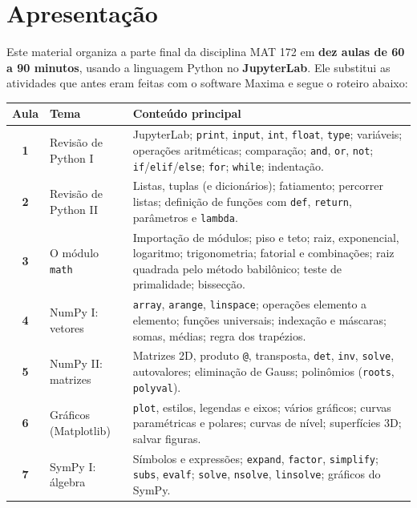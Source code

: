 \chapter*{Apresentação}

Este material organiza a parte final da disciplina MAT 172 em \textbf{dez aulas de 60 a 90 minutos},
usando a linguagem Python no \textbf{JupyterLab}. Ele substitui as atividades que antes eram feitas com o
software Maxima e segue o roteiro abaixo:

\begin{center}
\renewcommand{\arraystretch}{1.25}
\begin{tabularx}{\linewidth}{@{}>{\sffamily\bfseries}c >{\raggedright\arraybackslash}p{4.2cm} X @{}}
\toprule
\textbf{Aula} & \textbf{Tema} & \textbf{Conteúdo principal}\\
\midrule
1 & Revisão de Python I & JupyterLab; \texttt{print}, \texttt{input}, \texttt{int}, \texttt{float}, \texttt{type}; variáveis; operações aritméticas; comparação; \texttt{and}, \texttt{or}, \texttt{not}; \texttt{if}/\texttt{elif}/\texttt{else}; \texttt{for}; \texttt{while}; indentação.\\
2 & Revisão de Python II & Listas, tuplas (e dicionários); fatiamento; percorrer listas; definição de funções com \texttt{def}, \texttt{return}, parâmetros e \texttt{lambda}.\\
3 & O módulo \texttt{math} & Importação de módulos; piso e teto; raiz, exponencial, logaritmo; trigonometria; fatorial e combinações; raiz quadrada pelo método babilônico; teste de primalidade; bissecção.\\
4 & NumPy I: vetores & \texttt{array}, \texttt{arange}, \texttt{linspace}; operações elemento a elemento; funções universais; indexação e máscaras; somas, médias; regra dos trapézios.\\
5 & NumPy II: matrizes & Matrizes 2D, produto \texttt{@}, transposta, \texttt{det}, \texttt{inv}, \texttt{solve}, autovalores; eliminação de Gauss; polinômios (\texttt{roots}, \texttt{polyval}).\\
6 & Gráficos (Matplotlib) & \texttt{plot}, estilos, legendas e eixos; vários gráficos; curvas paramétricas e polares; curvas de nível; superfícies 3D; salvar figuras.\\
7 & SymPy I: álgebra & Símbolos e expressões; \texttt{expand}, \texttt{factor}, \texttt{simplify}; \texttt{subs}, \texttt{evalf}; \texttt{solve}, \texttt{nsolve}, \texttt{linsolve}; gráficos do SymPy.\\

\end{tabularx}
\end{center}

